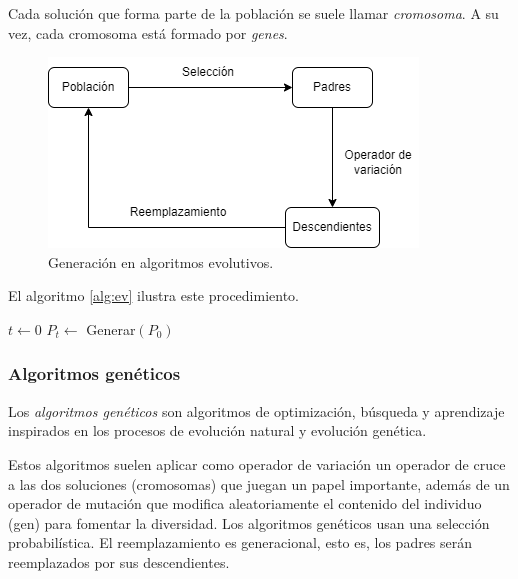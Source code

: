 Cada solución que forma parte de la población se suele llamar \emph{cromosoma}. A su vez, cada cromosoma está formado por \emph{genes}.

\begin{figure}[H]   
	\center
	\includegraphics[scale=0.5]{figures/Algoritmos_evolutivos.png}
	\caption{Generación en algoritmos evolutivos.}
    \label{fg:alg_ev}
\end{figure}

El algoritmo \ref{alg:ev} ilustra este procedimiento.

\begin{Ualgorithm}[H]
    \label{alg:ev}
    \small
    \DontPrintSemicolon
    $t \longleftarrow 0$\;
    $P_t \longleftarrow$ Generar$(P_0)$ 

\end{Ualgorithm}

\subsubsection{Algoritmos genéticos}

Los \emph{algoritmos genéticos} son algoritmos de optimización, búsqueda y aprendizaje inspirados en los procesos de evolución natural y evolución genética.

Estos algoritmos suelen aplicar como operador de variación un operador de cruce a las dos soluciones (cromosomas) que juegan un papel importante, además de un operador de mutación que modifica aleatoriamente el contenido del individuo (gen) para fomentar la diversidad. Los algoritmos genéticos usan una selección probabilística. El reemplazamiento es generacional, esto es, los padres serán reemplazados por sus descendientes.

